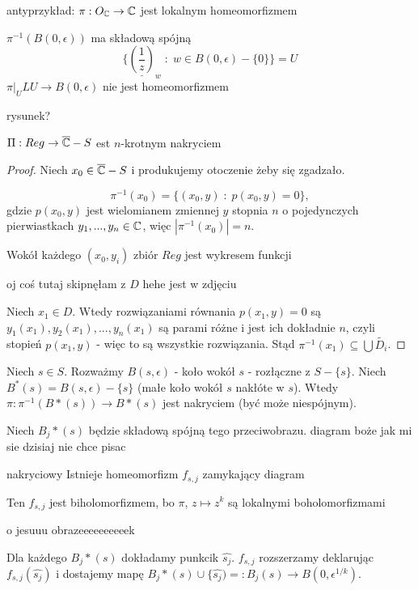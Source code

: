 \begin{example}
  antyprzykład: $\pi:O_{\mathbb{C}}\to \mathbb{C}$ jest lokalnym homeomorfizmem

  $\pi^{-1}(B(0,\epsilon))$ ma składową spójną
  $$\{\underline{(\frac{1}{z})}_w\;:\;w\in B(0,\epsilon)-\{0\}\}=U$$
  $\pi|_ULU\to B(0,\epsilon)$ nie jest homeomorfizmem

  rysunek?
\end{example}

\begin{fact}{}{}
  $\Pi:Reg\to \overline{\mathbb{C}}-S$ est $n$-krotnym nakryciem
\end{fact}

\begin{proof}
  Niech $x_0\in\overline{\mathbb{C}}-S$ i produkujemy otoczenie żeby się zgadzało.

  $$\pi^{-1}(x_0)=\{(x_0, y)\;:\;p(x_0,y)=0\},$$
  gdzie $p(x_0, y)$ jest wielomianem zmiennej $y$ stopnia $n$ o pojedynczych pierwiastkach $y_1,..., y_n\in\mathbb{C}$, więc $|\pi^{-1}(x_0)|=n$.

  Wokół każdego $(x_0, y_i)$ zbiór $Reg$ jest wykresem funkcji

  {\color{red}
    oj coś tutaj skipnęłam z $D$ hehe
    jest w zdjęciu
  }

  Niech $x_1\in D$. Wtedy rozwiązaniami równania $p(x_1, y)=0$ są $y_1(x_1), y_2(x_1),..., y_n(x_1)$ są parami różne i jest ich dokładnie $n$, czyli stopień $p(x_1, y)$ - więc to są wszystkie rozwiązania. Stąd $\pi^{-1}(x_1)\subseteq\bigcup\widetilde{D_i}$.
\end{proof}

Niech $s\in S$. Rozważmy $B(s, \epsilon)$ - koło wokół $s$ - rozłączne z $S-\{s\}$. Niech $B^*(s)=B(s, \epsilon)-\{s\}$ (małe koło wokół $s$ nakłóte w $s$). Wtedy $\pi:\pi^{-1}(B*(s))\to B*(s)$ jest nakryciem (być może niespójnym). 

Niech $B_j*(s)$ będzie składową spójną tego przeciwobrazu.
diagram boże jak mi sie dzisiaj nie chce pisac

\begin{lemma}{nakryciowy}{}
  Istnieje homeomorfizm $f_{s,j}$ zamykający diagram

  Ten $f_{s,j}$ jest biholomorfizmem, bo $\pi$, $z\mapsto z^k$ są lokalnymi boholomorfizmami
\end{lemma}

o jesuuu obrazeeeeeeeeeek

Dla każdego $B_j*(s)$ dokładamy punkcik $\hat{s_j}$. $f_{s,j}$ rozszerzamy deklarując $f_{s,j}(\hat{s_j})$ i dostajemy mapę $B_j*(s)\cup\{\hat{s_j})=:B_j(s)\to B(0, \epsilon^{1/k})$.


